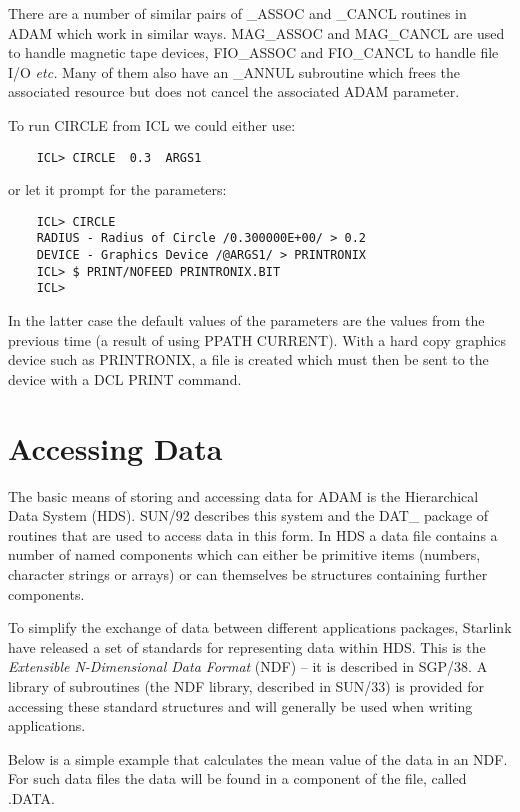 \documentclass[twoside,11pt]{report}
\newcommand{\xlabel}[1]{}
\begin{document}
There are a number of similar pairs of \_ASSOC and \_CANCL routines in ADAM
which work in similar ways. MAG\_ASSOC and MAG\_CANCL are used to handle
magnetic tape devices, FIO\_ASSOC and FIO\_CANCL to handle file I/O {\em etc.}
Many of them also have an \_ANNUL subroutine which frees the associated
resource but does not cancel the associated ADAM parameter.

To run CIRCLE from ICL we could either use:

\begin{verbatim}
    ICL> CIRCLE  0.3  ARGS1
\end{verbatim}

or let it prompt for the parameters:

\begin{verbatim}
    ICL> CIRCLE
    RADIUS - Radius of Circle /0.300000E+00/ > 0.2
    DEVICE - Graphics Device /@ARGS1/ > PRINTRONIX
    ICL> $ PRINT/NOFEED PRINTRONIX.BIT
    ICL>                               
\end{verbatim}

In the latter case the default values of the parameters are the values from the
previous time (a result of using PPATH CURRENT). With a hard copy graphics
device such as PRINTRONIX, a file is created which must then be sent to
the device with a DCL PRINT command.
                                                                  
\section{\xlabel{accessing_data}Accessing Data}
\label{accdat}
The basic means of storing and accessing data for ADAM is the Hierarchical
Data System (HDS). SUN/92 describes this system
and the DAT\_ package of routines that are used to access data in this form.
In HDS a data file contains a number of named components which can
either be primitive items (numbers, character strings or arrays) or can
themselves be structures containing further components.

To simplify the exchange of data between different applications packages,
Starlink have released a set of standards for representing data within HDS.
This is the {\em Extensible N-Dimensional Data Format} (NDF) -- it is
described in SGP/38. A library of subroutines (the NDF library, described in 
SUN/33) is provided for accessing these standard structures and will generally
be used when writing applications.

Below is a simple example that calculates the mean value of the data in
an NDF. For such data files the data will be found in a component
of the file, called .DATA.
\end{document}
